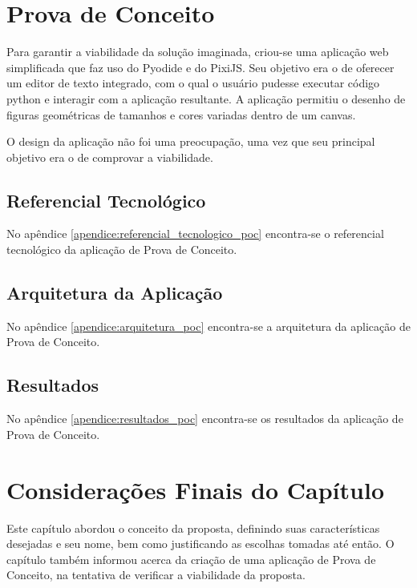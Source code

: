 \section{Prova de Conceito}

Para garantir a viabilidade da solução imaginada, criou-se uma aplicação web simplificada que faz uso do Pyodide e do PixiJS. Seu objetivo era o de oferecer um editor de texto integrado, com o qual o usuário pudesse executar código python e interagir com a aplicação resultante. A aplicação permitiu o desenho de figuras geométricas de tamanhos e cores variadas dentro de um canvas.

O design da aplicação não foi uma preocupação, uma vez que seu principal objetivo era o de comprovar a viabilidade.

\subsection{Referencial Tecnológico}

No apêndice \ref{apendice:referencial_tecnologico_poc} encontra-se o referencial tecnológico da aplicação de Prova de Conceito.

\subsection{Arquitetura da Aplicação}

No apêndice \ref{apendice:arquitetura_poc} encontra-se a arquitetura da aplicação de Prova de Conceito.

\subsection{Resultados}

No apêndice \ref{apendice:resultados_poc} encontra-se os resultados da aplicação de Prova de Conceito.

\section{Considerações Finais do Capítulo}

Este capítulo abordou o conceito da proposta, definindo suas características desejadas e seu nome,
bem como justificando as escolhas tomadas até então. O capítulo também informou acerca da criação
de uma aplicação de Prova de Conceito, na tentativa de verificar a viabilidade da proposta.